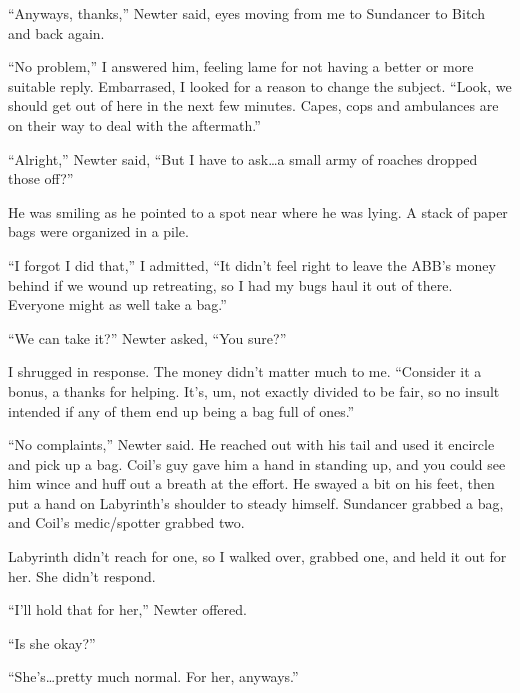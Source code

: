 ``Anyways, thanks,'' Newter said, eyes moving from me to Sundancer to Bitch and back again.



``No problem,'' I answered him, feeling lame for not having a better or more suitable reply.  Embarrased, I looked for a reason to change the subject.  ``Look, we should get out of here in the next few minutes.  Capes, cops and ambulances are on their way to deal with the aftermath.''



``Alright,'' Newter said, ``But I have to ask\ldots a small army of roaches dropped those off?''



He was smiling as he pointed to a spot near where he was lying.  A stack of paper bags were organized in a pile.



``I forgot I did that,'' I admitted, ``It didn't feel right to leave the ABB's money behind if we wound up retreating, so I had my bugs haul it out of there.  Everyone might as well take a bag.''



``We can take it?'' Newter asked, ``You sure?''



I shrugged in response.  The money didn't matter much to me.  ``Consider it a bonus, a thanks for helping.  It's, um, not exactly divided to be fair, so no insult intended if any of them end up being a bag full of ones.''



``No complaints,'' Newter said.  He reached out with his tail and used it encircle and pick up a bag.  Coil's guy gave him a hand in standing up, and you could see him wince and huff out a breath at the effort.  He swayed a bit on his feet, then put a hand on Labyrinth's shoulder to steady himself.  Sundancer grabbed a bag, and Coil's medic/spotter grabbed two.



Labyrinth didn't reach for one, so I walked over, grabbed one, and held it out for her.  She didn't respond.



``I'll hold that for her,'' Newter offered.



``Is she okay?''



``She's\ldots pretty much normal.  For her, anyways.''



